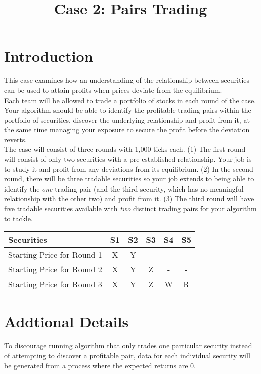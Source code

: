 \documentclass{amsart}
\renewcommand{\_}[1]{\underline{ #1 }}
\theoremstyle{definition}
\numberwithin{equation}{subsection}
\begin{document}
\title{Case 2: Pairs Trading}
\maketitle

\setlength{\parindent}{0.5cm}
\section{Introduction}
This case examines how an understanding of the relationship between securities can be used to attain profits when prices deviate from the equilibrium.  \\

Each team will be allowed to trade a portfolio of stocks in each round of the case. Your algorithm should be able to identify the profitable trading pairs within the portfolio of securities, discover the underlying relationship and profit from it, at the same time managing your exposure to secure the profit before the deviation reverts. \\

The case will consist of three rounds with 1,000 ticks each. (1) The first round will consist of only two securities with a pre-established relationship. Your job is to study it and profit from any deviations from its equilibrium. (2) In the second round, there will be three tradable securities so your job extends to being able to identify the {\it one} trading pair (and the third security,  which has no meaningful relationship with the other two) and profit from it. (3) The third round will have five tradable securities available with {\it two} distinct trading pairs for your algorithm to tackle. \\

\begin{center}
    \begin{tabular}{ | l | c | c | c | c | c |}
    \hline
    Securities & S1 & S2 & S3 & S4 & S5 \\ \hline
	Starting Price for Round 1  & X & Y & - & - & -\\ \hline
	Starting Price for Round 2  & X & Y & Z & - & - \\ \hline
	Starting Price for Round 3 & X & Y & Z & W & R\\
    \hline
    \end{tabular}
\newline
\end{center}
 

\section{Addtional Details}
To discourage running algorithm that only trades one particular security instead of attempting to discover a profitable pair, data for each individual security will be generated from a process where the expected returns are 0.
\\
\end{document}
